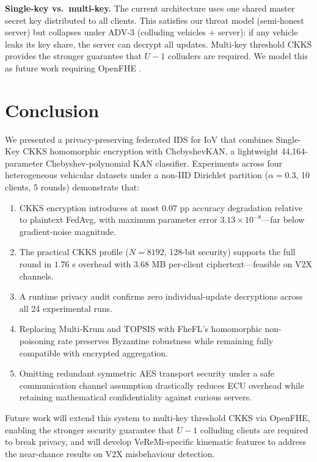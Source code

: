 \documentclass[conference]{IEEEtran}
\begin{document}
\textbf{Single-key vs.\ multi-key.}
The current architecture uses one shared master secret key distributed
to all clients. This satisfies our threat model (semi-honest server)
but collapses under ADV-3 (colluding vehicles + server): if any vehicle
leaks its key share, the server can decrypt all updates. Multi-key threshold
CKKS \cite{fhefl2023} provides the stronger guarantee that $U{-}1$ colluders
are required. We model this as future work requiring OpenFHE \cite{openfhe}.

\section{Conclusion}

We presented a privacy-preserving federated IDS for IoV that combines
Single-Key CKKS homomorphic encryption with ChebyshevKAN, a lightweight
44,164-parameter Chebyshev-polynomial KAN classifier. Experiments across
four heterogeneous vehicular datasets under a non-IID Dirichlet partition
($\alpha{=}0.3$, 10 clients, 5 rounds) demonstrate that:

\begin{enumerate}
  \item CKKS encryption introduces at most $0.07$ pp accuracy degradation
        relative to plaintext FedAvg, with maximum parameter error
        $3.13 \times 10^{-8}$---far below gradient-noise magnitude.
  \item The practical CKKS profile ($N{=}8192$, 128-bit security) supports
        the full round in $1.76$ s overhead with $3.68$ MB per-client
        ciphertext---feasible on V2X channels.
  \item A runtime privacy audit confirms zero individual-update decryptions
        across all 24 experimental runs.
  \item Replacing Multi-Krum and TOPSIS with FheFL's homomorphic
        non-poisoning rate preserves Byzantine robustness while remaining
        fully compatible with encrypted aggregation.
  \item Omitting redundant symmetric AES transport security under a safe
        communication channel assumption drastically reduces ECU overhead
        while retaining mathematical confidentiality against curious servers.
\end{enumerate}

Future work will extend this system to multi-key threshold CKKS
via OpenFHE, enabling the stronger security guarantee that
$U{-}1$ colluding clients are required to break privacy, and will develop
VeReMi-specific kinematic features to address the near-chance results
on V2X misbehaviour detection.
\end{document}
